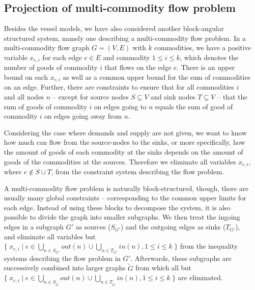 \subsection{Projection of multi-commodity flow problem}
Besides the vessel models, we have also considered another block-angular structured system, namely one describing a multi-commodity flow problem. In a multi-commodity flow graph $G=(V,E)$ with $k$ commodities, we have a positive variable $x_{e,i}$ for each edge $e\in E$ and commodity $1\leq i\leq k$, which denotes the number of goods of commodity $i$ that flows on the edge $e$. There is an upper bound on each $x_{e,i}$ as well as a common upper bound for the sum of commodities on an edge. Further, there are constraints to ensure that for all commodities $i$ and all nodes $n$ -- except for source nodes $S\subseteq V$ and sink nodes $T\subseteq V$ -- that the sum of goods of commodity $i$ on edges going to $n$ equals the sum of good of commodity $i$ on edges going away from $n$.

Considering the case where demands and supply are not given, we want to know how much can flow from the source-nodes to the sinks, or more specifically, how the amount of goods of each commodity at the sinks depends on the amount of goods of the commodities at the sources. Therefore we eliminate all variables $x_{e,i}$, where $e\notin S\cup T$, from the constraint system describing the flow problem.
		
A multi-commodity flow problem is naturally block-structured, though, there are usually many global constraints -- corresponding to the common upper limits for each edge. Instead of using these blocks to decompose the system, it is also possible to divide the graph into smaller subgraphs. We then treat the ingoing edges in a subgraph $G'$ as sources ($S_{G'}$) and the outgoing edges as sinks ($T_{G'}$), and eliminate all variables but $\{\;x_{e,i}\;|\; e\in \bigcup_{n\in S_{G'}}out(n)\cup \bigcup_{n\in T_{G'}}in(n), 1\leq i\leq k\;\}$ from the inequality systems describing the flow problem in $G'$. Afterwards, these  subgraphs are successively combined into larger graphs $\tilde{G}$ from which all but $\{\;x_{e,i}\;|\; e\in \bigcup_{n\in S_{\tilde G}}out(n)\cup \bigcup_{n\in T_{\tilde G}}in(n), 1\leq i\leq k\;\}$ are eliminated. 


